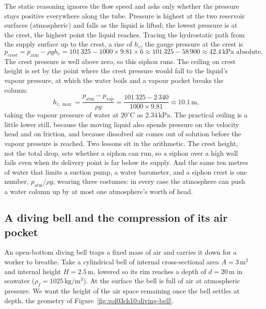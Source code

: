 The static reasoning ignores the flow speed and asks only whether the
pressure stays positive everywhere along the tube. Pressure is highest at
the two reservoir surfaces (atmospheric) and falls as the liquid is lifted;
the lowest pressure is at the crest, the highest point the liquid reaches.
Tracing the hydrostatic path from the supply surface up to the crest, a
rise of $h_c$, the gauge pressure at the crest is
\[
p_{\text{crest}} = p_{\text{atm}} - \rho g h_c
= 101\,325 - 1000 \times 9.81 \times 6
\approx 101\,325 - 58\,900 \approx 42.4\,\text{kPa absolute}.
\]
The crest pressure is well above zero, so this siphon runs. The ceiling on
crest height is set by the point where the crest pressure would fall to the
liquid's vapour pressure, at which the water boils and a vapour pocket
breaks the column:
\[
h_{c,\max} = \frac{p_{\text{atm}} - p_{\text{vap}}}{\rho g}
= \frac{101\,325 - 2\,340}{1000 \times 9.81}
\approx 10.1\,\si{\meter},
\]
taking the vapour pressure of water at $20^{\circ}\text{C}$ as
$2.34\,\text{kPa}$. The practical ceiling is a little lower still, because
the moving liquid also spends pressure on the velocity head and on
friction, and because dissolved air comes out of solution before the
vapour pressure is reached. Two lessons sit in the arithmetic. The crest
height, not the total drop, sets whether a siphon can run, so a siphon over
a high wall fails even when its delivery point is far below its supply. And
the same ten metres of water that limits a suction pump, a water barometer,
and a siphon crest is one number, $p_{\text{atm}}/\rho g$, wearing three
costumes: in every case the atmosphere can push a water column up by at
most one atmosphere's worth of head.



\subsection{A diving bell and the compression of its air pocket}

An open-bottom diving bell traps a fixed mass of air and carries it down
for a worker to breathe. Take a cylindrical bell of internal
cross-sectional area $A = 3\,\text{m}^2$ and internal height $H = 2.5\,\si{
\meter}$, lowered so its rim reaches a depth of $d = 20\,\si{\meter}$ in
seawater ($\rho_f = 1025\,\si{\kilogram\per\meter\cubed}$). At the surface
the bell is full of air at atmospheric pressure. We want the height of the
air space remaining once the bell settles at depth, the geometry of
Figure~\ref{fig:vol03ch10:diving-bell}.

